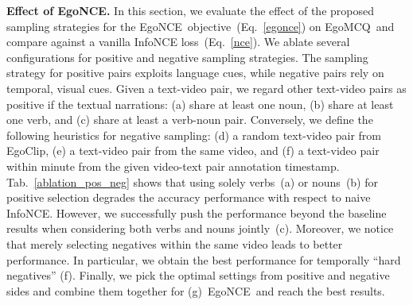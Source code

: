 \documentclass{article}
\newcommand{\dataset}{EgoClip}
\newcommand{\model}{EgoNCE\xspace}
\newcommand{\eval}{EgoMCQ}
\begin{document}
\textbf{Effect of \model.}
In this section, we evaluate the effect of the proposed sampling strategies for the \model~objective~(Eq.~\ref{egonce}) on \eval~and compare against a vanilla InfoNCE loss~(Eq.~\ref{nce}). We ablate several configurations for positive and negative sampling strategies. 
The sampling strategy for positive pairs exploits language cues, while negative pairs rely on temporal, visual cues.
Given a text-video pair, we regard other text-video pairs as positive if the textual narrations: 
(a) share at least one noun, 
(b) share at least one verb, and (c) share at least a verb-noun pair. 
Conversely, we define the following heuristics for negative sampling: 
(d) a random text-video pair from \dataset, 
(e) a text-video pair from the same video, and
(f) a text-video pair within  minute from the given video-text pair annotation timestamp. 
Tab.~\ref{ablation_pos_neg} shows that using solely verbs~(a) or nouns~(b) for positive selection degrades the accuracy performance with respect to naive InfoNCE. However, we successfully push the performance beyond the baseline results when considering both verbs and nouns jointly~(c). 
Moreover, we notice that merely selecting negatives within the same video leads to better performance. In particular, we obtain the best performance for temporally ``hard negatives'' (f).
Finally, we pick the optimal settings from positive and negative sides and combine them together for (g)~\model~and reach the best results.
\end{document}
